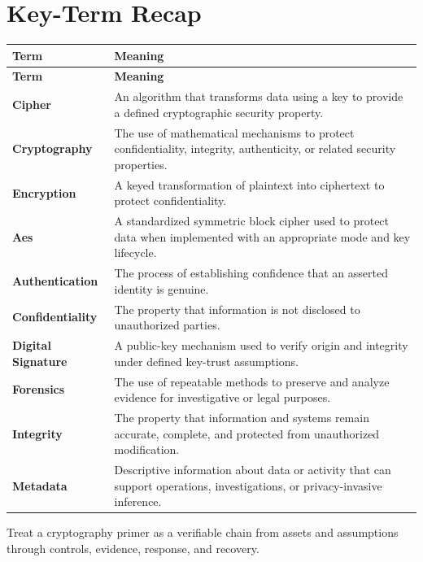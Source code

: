 \documentclass[11pt]{article}
\begin{document}
\section*{Key-Term Recap}
\begin{longtable}{>{\RaggedRight\arraybackslash}p{}>{\RaggedRight\arraybackslash}p{}}
\toprule\rowcolor{Navy}\color{white}\textbf{Term} & \color{white}\textbf{Meaning}\\\midrule
\endfirsthead
\toprule\rowcolor{Navy}\color{white}\textbf{Term} & \color{white}\textbf{Meaning}\\\midrule
\endhead
\textbf{Cipher} & An algorithm that transforms data using a key to provide a defined cryptographic security property. \\\midrule
\textbf{Cryptography} & The use of mathematical mechanisms to protect confidentiality, integrity, authenticity, or related security properties. \\\midrule
\textbf{Encryption} & A keyed transformation of plaintext into ciphertext to protect confidentiality. \\\midrule
\textbf{Aes} & A standardized symmetric block cipher used to protect data when implemented with an appropriate mode and key lifecycle. \\\midrule
\textbf{Authentication} & The process of establishing confidence that an asserted identity is genuine. \\\midrule
\textbf{Confidentiality} & The property that information is not disclosed to unauthorized parties. \\\midrule
\textbf{Digital Signature} & A public-key mechanism used to verify origin and integrity under defined key-trust assumptions. \\\midrule
\textbf{Forensics} & The use of repeatable methods to preserve and analyze evidence for investigative or legal purposes. \\\midrule
\textbf{Integrity} & The property that information and systems remain accurate, complete, and protected from unauthorized modification. \\\midrule
\textbf{Metadata} & Descriptive information about data or activity that can support operations, investigations, or privacy-invasive inference. \\\midrule
\bottomrule
\end{longtable}
\begin{takeawaybox}
Treat a cryptography primer as a verifiable chain from assets and assumptions through controls, evidence, response, and recovery.
\end{takeawaybox}
\end{document}
